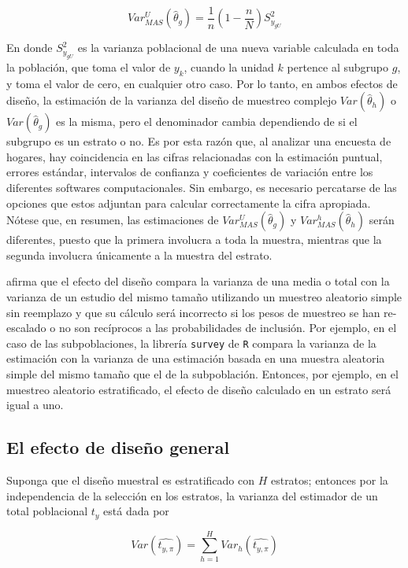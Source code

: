 \documentclass[
  12pt,
  spanish,
]{book}
\begin{document}
\[
Var_{MAS}^U(\hat\theta_g)=\frac{1}{n}\left(1-\frac{n}{N}\right)S^2_{y_{gU}}
\]

En donde \(S^2_{y_{gU}}\) es la varianza poblacional de una nueva variable calculada en toda la población, que toma el valor de \(y_k\), cuando la unidad \(k\) pertence al subgrupo \(g\), y toma el valor de cero, en cualquier otro caso. Por lo tanto, en ambos efectos de diseño, la estimación de la varianza del diseño de muestreo complejo \(Var (\hat\theta_h)\) o \(Var (\hat\theta_g)\) es la misma, pero el denominador cambia dependiendo de si el subgrupo es un estrato o no. Es por esta razón que, al analizar una encuesta de hogares, hay coincidencia en las cifras relacionadas con la estimación puntual, errores estándar, intervalos de confianza y coeficientes de variación entre los diferentes softwares computacionales. Sin embargo, es necesario percatarse de las opciones que estos adjuntan para calcular correctamente la cifra apropiada. Nótese que, en resumen, las estimaciones de \(Var_{MAS}^U(\hat\theta_g)\) y \(Var_{MAS}^h(\hat\theta_h)\) serán diferentes, puesto que la primera involucra a toda la muestra, mientras que la segunda involucra únicamente a la muestra del estrato.

\citet{Lumley_2010} afirma que el efecto del diseño compara la varianza de una media o total con la varianza de un estudio del mismo tamaño utilizando un muestreo aleatorio simple sin reemplazo y que su cálculo será incorrecto si los pesos de muestreo se han re-escalado o no son recíprocos a las probabilidades de inclusión. Por ejemplo, en el caso de las subpoblaciones, la librería \texttt{survey} de \texttt{R} compara la varianza de la estimación con la varianza de una estimación basada en una muestra aleatoria simple del mismo tamaño que el de la subpoblación. Entonces, por ejemplo, en el muestreo aleatorio estratificado, el efecto de diseño calculado en un estrato será igual a uno.

\hypertarget{el-efecto-de-diseuxf1o-general}{%
\subsection{El efecto de diseño general}\label{el-efecto-de-diseuxf1o-general}}

Suponga que el diseño muestral es estratificado con \(H\) estratos; entonces por la independencia de la selección en los estratos, la varianza del estimador de un total poblacional \(t_y\) está dada por

\[
Var\left(\widehat{t_{y,\pi}}\right)=\sum_{h=1}^{H}Var_h\left(\widehat{t_{y,\pi}}\right)
\]
\end{document}
